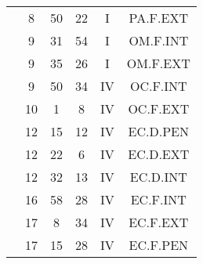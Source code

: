 \documentclass[12pt, a4paper]{article}
\begin{document}
\begin{multicols}{3}
{\begin{tabular}{c c c c c c}
	 	 	 	 & 8 & 50 & 22 & I & PA.F.EXT\\%
	 	 	 	 & 9 & 31 & 54 & I & OM.F.INT\\%
	 	 	 	 & 9 & 35 & 26 & I & OM.F.EXT\\%
	 	 	 	 & 9 & 50 & 34 & IV & OC.F.INT\\%
	 	 	 	 & 10 & 1 & 8 & IV & OC.F.EXT\\%
	 	 	 	 & 12 & 15 & 12 & IV & EC.D.PEN\\%
	 	 	 	 & 12 & 22 & 6 & IV & EC.D.EXT\\%
	 	 	 	 & 12 & 32 & 13 & IV & EC.D.INT\\%
	 	 	 	 & 16 & 58 & 28 & IV & EC.F.INT\\%
	 	 	 	 & 17 & 8 & 34 & IV & EC.F.EXT\\%
	 	 	 	 & 17 & 15 & 28 & IV & EC.F.PEN\\%
	 	 \end{tabular}
 	}
\end{multicols}
\end{document}
